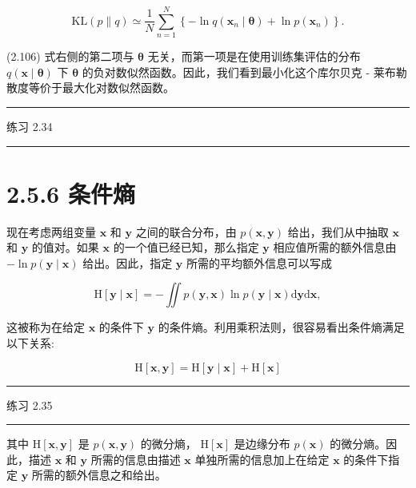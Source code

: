 \documentclass[10pt]{report}
\newcommand{\HRule}{\begin{center}\rule{0.9\linewidth}{0.2mm}\end{center}}
\begin{document}
\[
\mathrm{{KL}}\left( {p\parallel q}\right)  \simeq  \frac{1}{N}\mathop{\sum }\limits_{{n = 1}}^{N}\left\{  {-\ln q\left( {{\mathbf{x}}_{n} \mid  \mathbf{\theta }}\right)  + \ln p\left( {\mathbf{x}}_{n}\right) }\right\}  . \tag{2.106}
\]

(2.106) 式右侧的第二项与 \(\mathbf{\theta }\) 无关，而第一项是在使用训练集评估的分布 \(q\left( {\mathbf{x} \mid  \mathbf{\theta }}\right)\) 下 \(\mathbf{\theta }\) 的负对数似然函数。因此，我们看到最小化这个库尔贝克 - 莱布勒散度等价于最大化对数似然函数。

\HRule

练习 2.34

\HRule

\section*{2.5.6 条件熵}

现在考虑两组变量 \(\mathbf{x}\) 和 \(\mathbf{y}\) 之间的联合分布，由 \(p\left( {\mathbf{x},\mathbf{y}}\right)\) 给出，我们从中抽取 \(\mathbf{x}\) 和 \(\mathbf{y}\) 的值对。如果 \(\mathbf{x}\) 的一个值已经已知，那么指定 \(\mathbf{y}\) 相应值所需的额外信息由 \(- \ln p\left( {\mathbf{y} \mid  \mathbf{x}}\right)\) 给出。因此，指定 \(\mathbf{y}\) 所需的平均额外信息可以写成

\[
\mathrm{H}\left\lbrack  {\mathbf{y} \mid  \mathbf{x}}\right\rbrack   =  - \iint p\left( {\mathbf{y},\mathbf{x}}\right) \ln p\left( {\mathbf{y} \mid  \mathbf{x}}\right) \mathrm{d}\mathbf{y}\mathrm{d}\mathbf{x}, \tag{2.107}
\]

这被称为在给定 \(\mathbf{x}\) 的条件下 \(\mathbf{y}\) 的条件熵。利用乘积法则，很容易看出条件熵满足以下关系:

\[
\mathrm{H}\left\lbrack  {\mathbf{x},\mathbf{y}}\right\rbrack   = \mathrm{H}\left\lbrack  {\mathbf{y} \mid  \mathbf{x}}\right\rbrack   + \mathrm{H}\left\lbrack  \mathbf{x}\right\rbrack   \tag{2.108}
\]

\HRule

练习 2.35

\HRule

其中 \(\mathrm{H}\left\lbrack  {\mathbf{x},\mathbf{y}}\right\rbrack\) 是 \(p\left( {\mathbf{x},\mathbf{y}}\right)\) 的微分熵， \(\mathrm{H}\left\lbrack  \mathbf{x}\right\rbrack\) 是边缘分布 \(p\left( \mathbf{x}\right)\) 的微分熵。因此，描述 \(\mathbf{x}\) 和 \(\mathbf{y}\) 所需的信息由描述 \(\mathbf{x}\) 单独所需的信息加上在给定 \(\mathbf{x}\) 的条件下指定 \(\mathbf{y}\) 所需的额外信息之和给出。
\end{document}
